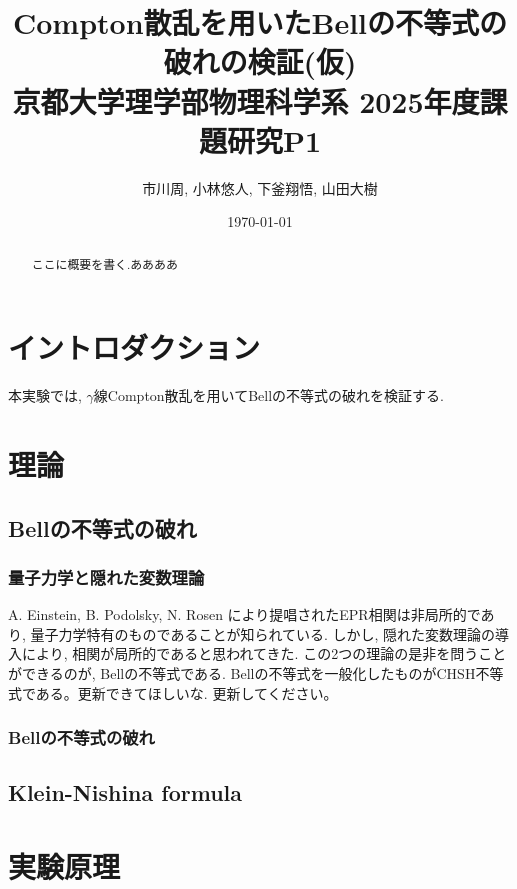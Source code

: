 \documentclass[a4paper,10pt,dvipdfmx,titlepage]{jsarticle}
\numberwithin{equation}{section}
\begin{document}
\title{Compton散乱を用いたBellの不等式の破れの検証(仮) \\%
{\large 京都大学理学部物理科学系 2025年度課題研究P1}}
\author{市川周, 小林悠人, 下釜翔悟, 山田大樹}
\date{\today}
\maketitle

\begin{abstract}
    ここに概要を書く.ああああ
\end{abstract}

\tableofcontents
\newpage

\section{イントロダクション}
本実験では, \(\gamma\)線Compton散乱を用いてBellの不等式の破れ\cite{EPR paradox}を検証する.

\section{理論}

\subsection{Bellの不等式の破れ}
\subsubsection{量子力学と隠れた変数理論}
A. Einstein, B. Podolsky, N. Rosen により提唱されたEPR相関は非局所的であり, 量子力学特有のものであることが知られている. 
しかし, 隠れた変数理論の導入により, 相関が局所的であると思われてきた. この2つの理論の是非を問うことができるのが, Bellの不等式である.
Bellの不等式を一般化したものがCHSH不等式である。更新できてほしいな. 更新してください。

\subsubsection{Bellの不等式の破れ}

\subsection{Klein-Nishina formula}

\section{実験原理}
\end{document}
